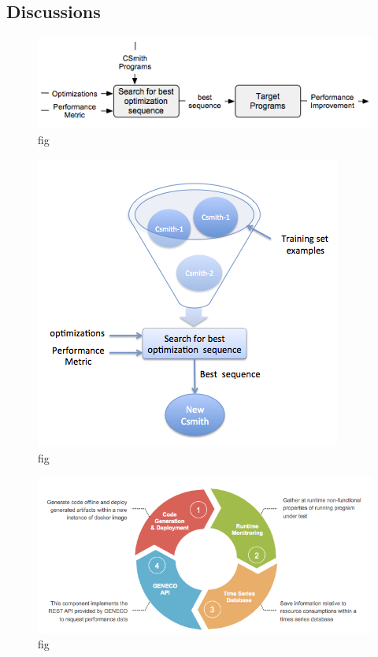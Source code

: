 \subsection{Discussions}



\begin{figure}[!t]
	\centering
	\includegraphics[width=1.\linewidth]{Ressources/sensitivity.png}
	\caption{fig}
\end{figure}

\begin{figure}[!t]
	\centering
	\includegraphics[width=1\hsize]{Ressources/approach by example.png}
	\caption{fig}
\end{figure}

\begin{figure}[!t]
	\centering
	\includegraphics[width=1\hsize]{Ressources/geneco approach.png}
	\caption{fig}
\end{figure}

